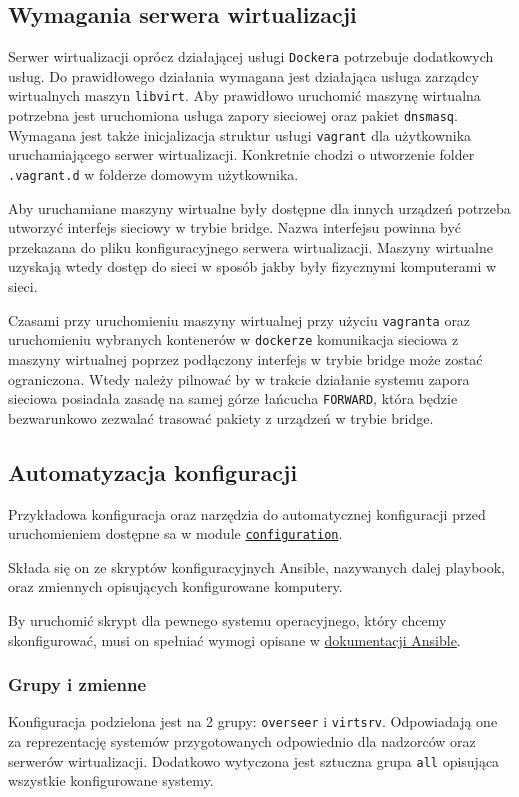 \documentclass[../opis-rozwiazania.tex]{subfiles}
\begin{document}
\subsection{Wymagania serwera wirtualizacji}
\label{system_requirements.virtsrv_rquirements}
Serwer wirtualizacji oprócz działającej usługi \texttt{Dockera} potrzebuje dodatkowych usług.
Do prawidłowego działania wymagana jest działająca usługa zarządcy wirtualnych maszyn \texttt{libvirt}.
Aby prawidłowo uruchomić maszynę wirtualna potrzebna jest uruchomiona usługa zapory sieciowej oraz pakiet \texttt{dnsmasq}.
Wymagana jest także inicjalizacja struktur usługi \texttt{vagrant} dla użytkownika uruchamiającego serwer wirtualizacji.
Konkretnie chodzi o utworzenie folder \texttt{.vagrant.d} w folderze domowym użytkownika.

Aby uruchamiane maszyny wirtualne były dostępne dla innych urządzeń potrzeba utworzyć interfejs sieciowy w trybie bridge.
Nazwa interfejsu powinna być przekazana do pliku konfiguracyjnego serwera wirtualizacji.
Maszyny wirtualne uzyskają wtedy dostęp do sieci w sposób jakby były fizycznymi komputerami w sieci.

Czasami przy uruchomieniu maszyny wirtualnej przy użyciu \texttt{vagranta} oraz uruchomieniu wybranych kontenerów w \texttt{dockerze} komunikacja sieciowa z maszyny wirtualnej poprzez podłączony interfejs w trybie bridge może zostać ograniczona. Wtedy należy pilnować by w trakcie działanie systemu zapora sieciowa posiadała zasadę na samej górze łańcucha \texttt{FORWARD}, która będzie bezwarunkowo zezwalać trasować pakiety z urządzeń w trybie bridge. 

\subsection{Automatyzacja konfiguracji}
\label{system_requirements.ansible_conf}
Przykładowa konfiguracja oraz narzędzia do automatycznej konfiguracji przed uruchomieniem dostępne sa w module \href{https://github.com/one-click-desktop/configuration}{\texttt{configuration}}.

Składa się on ze skryptów konfiguracyjnych Ansible, nazywanych dalej playbook, oraz zmiennych opisujących konfigurowane komputery.

By uruchomić skrypt dla pewnego systemu operacyjnego, który chcemy skonfigurować, musi on spełniać wymogi opisane w \href{https://docs.ansible.com/ansible/latest/plugins/connection.html#connection-plugins}{dokumentacji Ansible}.

\subsubsection{Grupy i zmienne}
Konfiguracja podzielona jest na 2 grupy: \texttt{overseer} i \texttt{virtsrv}.
Odpowiadają one za reprezentację systemów przygotowanych odpowiednio dla nadzorców oraz serwerów wirtualizacji.
Dodatkowo wytyczona jest sztuczna grupa \texttt{all} opisująca wszystkie konfigurowane systemy.
\end{document}
